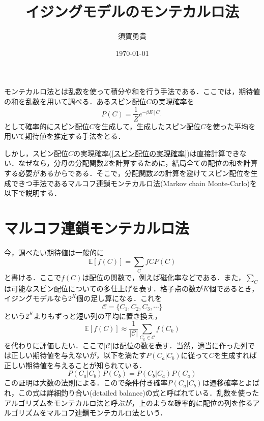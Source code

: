 \documentclass[a4paper,11pt]{jsarticle}
\begin{document}
\title{イジングモデルのモンテカルロ法}
\author{須賀勇貴}
\date{\today}
\maketitle

モンテカルロ法とは乱数を使って積分や和を行う手法である．ここでは，期待値の和を乱数を用いて調べる．あるスピン配位$C$の実現確率を
\begin{equation}
  \label{スピン配位の実現確率}
  P(C)=\frac{1}{Z}e^{-\beta E[C]}
\end{equation}
として確率的にスピン配位$C$を生成して，生成したスピン配位$C$を使った平均を用いて期待値を推定する手法をとる．\par
しかし，スピン配位$C$の実現確率(\ref{スピン配位の実現確率})は直接計算できない．なぜなら，分母の分配関数$Z$を計算するために，結局全ての配位の和を計算する必要があるからである．そこで，分配関数$Z$の計算を避けてスピン配位を生成できつ手法であるマルコフ連鎖モンテカルロ法(Markov chain Monte-Carlo)を以下で説明する．

\section{マルコフ連鎖モンテカルロ法}
今，調べたい期待値は一般的に
\begin{equation}
  \mathbb{E}[f(C)] = \sum_{C} f{C}P(C)
\end{equation}
と書ける．ここで$f(C)$は配位の関数で，例えば磁化率などである．また，$\sum_{C}$は可能なスピン配位についての多仕上げを表す．格子点の数が$K$個であるとき，イジングモデルなら$2^K$個の足し算になる．これを
\begin{equation}
  \mathcal{C} = \{ C_1, C_2, C_3, \cdots \}
\end{equation}
という$2^K$よりもずっと短い列の平均に置き換え，
\begin{equation}
  \mathbb{E}[f(C)] \approx \frac{1}{|\mathcal{C|}}\sum_{C_k \in \mathcal{C}}f(C_k)
\end{equation}
を代わりに評価したい．ここで$|\mathcal{C}|$は配位の数を表す．当然，適当に作った列では正しい期待値を与えないが，以下を満たす$P(C_a|C_b)$に従って$C$を生成すれば正しい期待値を与えることが知られている．
\begin{equation}
  P(C_a|C_b)P(C_b) = P(C_b|C_a)P(C_a)
\end{equation}
この証明は大数の法則による．こので条件付き確率$P(C_a|C_b)$は遷移確率とよばれ，この式は詳細釣り合い(detailed balance)の式と呼ばれている．乱数を使ったアルゴリズムをモンテカルロ法と呼ぶが，上のような確率的に配位の列を作るアルゴリズムをマルコフ連鎖モンテカルロ法という．\par
\end{document}
